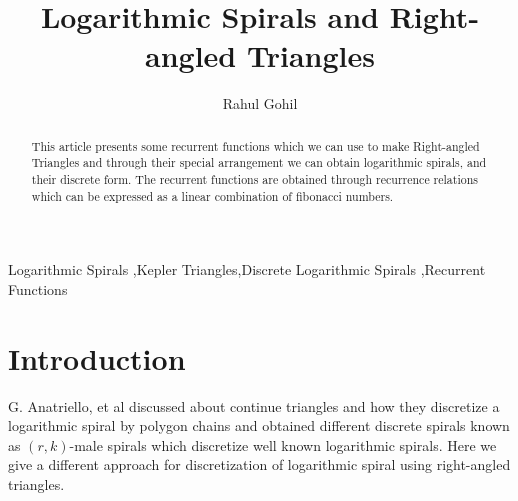 \documentclass[preprint,12pt]{elsarticle}
\begin{document}
\begin{frontmatter}

\title{Logarithmic Spirals and Right-angled Triangles}

\author{Rahul Gohil}

\address{Student, B.E(Computer Engineering), Thadomal Shahani Engineering College, Mumbai, India\\Affiliated to University of Mumbai}
\begin{abstract}
This article presents some recurrent functions which we can use to make Right-angled Triangles and through their special arrangement we can obtain logarithmic spirals, and their discrete form. The recurrent functions are obtained through recurrence relations which can be expressed as a linear combination of fibonacci numbers.  
\end{abstract}

\begin{keyword}
Logarithmic Spirals \sep Kepler Triangles\sep Discrete Logarithmic Spirals \sep Recurrent Functions 
\end{keyword}

\end{frontmatter}

\section{Introduction}
G. Anatriello, et al\cite{paper1} discussed about continue triangles and how they discretize a logarithmic spiral by polygon chains and obtained different discrete spirals known as $(r, k)$-male spirals which discretize well known logarithmic spirals. Here we give a different approach for discretization of logarithmic spiral using right-angled triangles.
 
\end{document}
